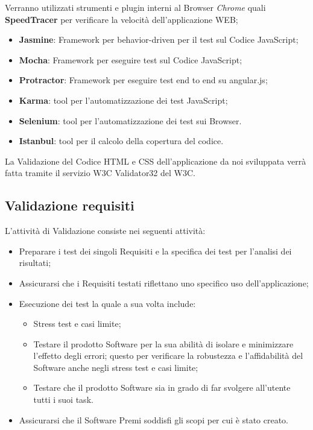 {	
	Verranno utilizzati strumenti e plugin interni al Browser \emph{Chrome} quali \textbf{SpeedTracer} per verificare la velocità dell'applicazione WEB;
	
	\begin{itemize}
	\label{sec:strumentiTest}
    \item \textbf{Jasmine}: Framework per behavior-driven per il test sul Codice JavaScript;
	\item \textbf{Mocha}: Framework per eseguire test sul Codice JavaScript;
	\item \textbf{Protractor}: Framework per eseguire test end to end su angular.js;
	\item \textbf{Karma}: tool per l'automatizzazione dei test JavaScript;
	\item \textbf{Selenium}: tool per l'automatizzazione dei test sui Browser.
	\item \textbf{Istanbul}: tool per il calcolo della copertura del codice.
   \end{itemize}
	
	
	La Validazione del Codice HTML e CSS dell’applicazione da noi sviluppata verrà
	fatta tramite il servizio W3C Validator32 del W3C.

		\subsection{Validazione requisiti}
		L'attività di Validazione consiste nei seguenti attività:
		\begin{itemize}
		\item Preparare i test dei singoli Requisiti e la specifica dei test per l'analisi dei risultati;
		\item Assicurarsi che i Requisiti testati riflettano uno specifico uso dell'applicazione;
		\item Esecuzione dei test la quale a sua volta include:
			\begin{itemize}
				\item Stress test e casi limite;
				\item Testare il prodotto Software per la sua abilità di isolare e minimizzare l'effetto degli errori; questo per verificare la robustezza e l’affidabilità del Software anche negli stress test e casi limite;
				\item Testare che il prodotto Software sia in grado di far svolgere all'utente tutti i suoi task.
			\end{itemize}
		\item Assicurarsi che il Software Premi soddisfi gli scopi per cui è stato creato.
		\end{itemize}		
}
